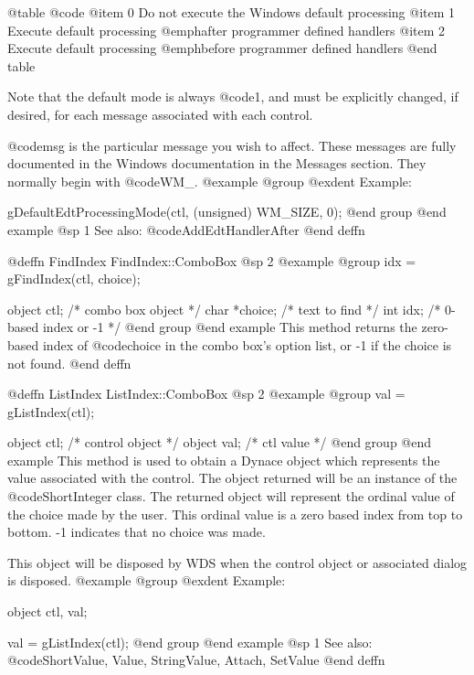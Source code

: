 {@table @code
@item 0
Do not execute the Windows default processing
@item 1
Execute default processing @emph{after} programmer defined handlers
@item 2
Execute default processing @emph{before} programmer defined handlers
@end table

Note that the default mode is always @code{1}, and must be explicitly
changed, if desired, for each message associated with each control.

@code{msg} is the particular message you wish to affect.  These messages
are fully documented in the Windows documentation in the Messages
section.  They normally begin with @code{WM_}.
@example
@group
@exdent Example:

gDefaultEdtProcessingMode(ctl, (unsigned) WM_SIZE, 0);
@end group
@end example
@sp 1
See also:  @code{AddEdtHandlerAfter}
@end deffn



@deffn {FindIndex} FindIndex::ComboBox
@sp 2
@example
@group
idx = gFindIndex(ctl, choice);

object  ctl;      /*  combo box object  */
char    *choice;  /*  text to find      */
int     idx;      /*  0-based index or -1  */
@end group
@end example
This method returns the zero-based index of @code{choice} in the
combo box's option list, or -1 if the choice is not found.
@end deffn

















@deffn {ListIndex} ListIndex::ComboBox
@sp 2
@example
@group
val = gListIndex(ctl);

object  ctl;   /*  control object  */
object  val;   /*  ctl value       */
@end group
@end example
This method is used to obtain a Dynace object which represents the value
associated with the control.  The object returned will be an instance of
the @code{ShortInteger} class.  The returned object will represent the
ordinal value of the choice made by the user.  This ordinal value is a
zero based index from top to bottom.  -1 indicates that no choice was
made.

This object will be disposed by WDS when the control object or
associated dialog is disposed.
@example
@group
@exdent Example:

object  ctl, val;

val = gListIndex(ctl);
@end group
@end example
@sp 1
See also:  @code{ShortValue, Value, StringValue, Attach, SetValue}
@end deffn




}
